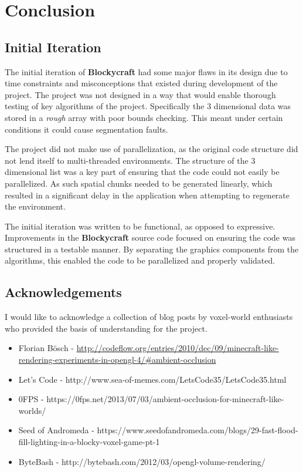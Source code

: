 \documentclass{book}
\newcommand{\Blockycraft}{\textbf{Blockycraft}}
\begin{document}

\chapter{Conclusion}
\section{Initial Iteration}
The initial iteration of \Blockycraft{} had some major flaws in its design due to time constraints and misconceptions that existed during development of the project.  The project was not designed in a way that would enable thorough testing of key algorithms of the project.  Specifically the 3 dimensional data was stored in a \textit{rough} array with poor bounds checking.  This meant under certain conditions it could cause segmentation faults.   

The project did not make use of parallelization, as the original code structure did not lend itself to multi-threaded environments.  The structure of the 3 dimensional list was a key part of ensuring that the code could not easily be parallelized.  As such spatial chunks needed to be generated linearly, which resulted in a significant delay in the application when attempting to regenerate the environment.

The initial iteration was written to be functional, as opposed to expressive.  Improvements in the \Blockycraft{} source code focused on ensuring the code was structured in a testable manner.  By separating the graphics components from the algorithms, this enabled the code to be parallelized and properly validated.

\section{Acknowledgements}
I would like to acknowledge a collection of blog posts by voxel-world enthusiasts who provided the basis of understanding for the project.

\begin{itemize}
	\item Florian Bösch - \url{http://codeflow.org/entries/2010/dec/09/minecraft-like-rendering-experiments-in-opengl-4/#ambient-occlusion}
	\item Let's Code - http://www.sea-of-memes.com/LetsCode35/LetsCode35.html
	\item 0FPS - https://0fps.net/2013/07/03/ambient-occlusion-for-minecraft-like-worlds/
	\item Seed of Andromeda - https://www.seedofandromeda.com/blogs/29-fast-flood-fill-lighting-in-a-blocky-voxel-game-pt-1
	\item ByteBash - http://bytebash.com/2012/03/opengl-volume-rendering/
\end{itemize}
\end{document}
